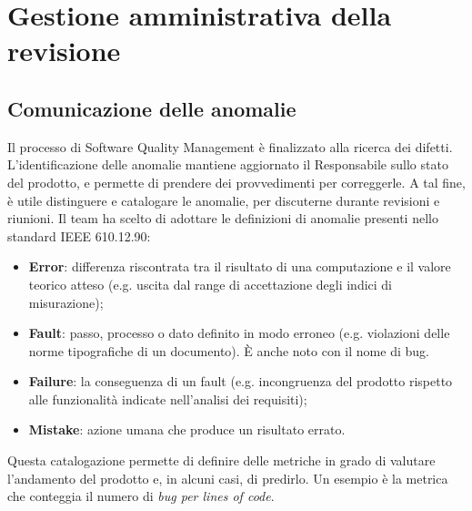 \section{Gestione amministrativa della revisione}
\subsection{Comunicazione delle anomalie}
Il processo di Software Quality Management è finalizzato alla ricerca dei difetti. L'identificazione delle anomalie mantiene aggiornato il Responsabile sullo stato del prodotto, e permette di prendere dei provvedimenti per correggerle. A tal fine, è utile distinguere e catalogare le anomalie, per discuterne durante revisioni e riunioni. Il team ha scelto di adottare le definizioni di anomalie presenti nello standard IEEE 610.12.90:
\begin{itemize}
\item \textbf{Error}: differenza riscontrata tra il risultato di una computazione e il valore teorico atteso (e.g. uscita dal range di accettazione degli indici di misurazione);
\item \textbf{Fault}: passo, processo o dato definito in modo erroneo (e.g. violazioni delle norme tipografiche di un documento). \`E anche noto con il nome di bug.
\item \textbf{Failure}: la conseguenza di un fault (e.g. incongruenza del prodotto rispetto alle funzionalità indicate nell'analisi dei requisiti);
\item \textbf{Mistake}: azione umana che produce un risultato errato.
\end{itemize}
Questa catalogazione permette di definire delle metriche in grado di valutare l'andamento del prodotto e, in alcuni casi, di predirlo. Un esempio è la metrica che conteggia il numero di \textit{bug per lines of code}.


